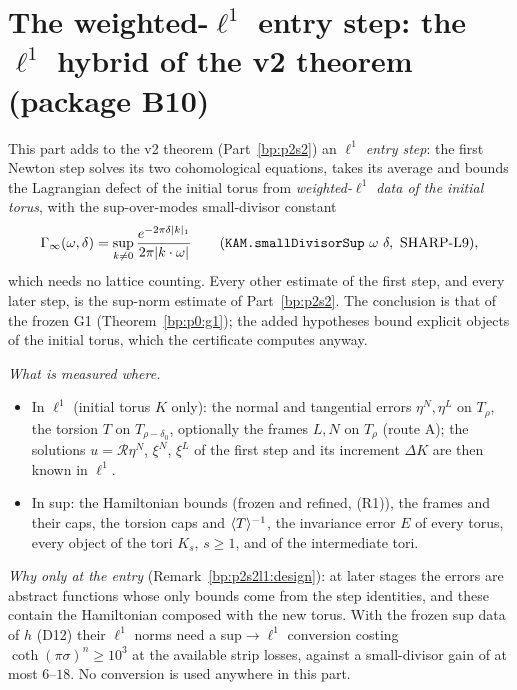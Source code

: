 \section{The weighted-$\ell^1$ entry step: the $\ell^1$ hybrid of the v2 theorem (package B10)}\label{bp:p2s2l1}

This part adds to the v2 theorem (Part~\ref{bp:p2s2}) an \emph{$\ell^1$ entry step}: the first Newton step solves its two
cohomological equations, takes its average and bounds the Lagrangian defect of the initial torus from \emph{weighted-$\ell^1$ data of the
initial torus}, with the sup-over-modes small-divisor constant
\[
\Gamma_\infty(\omega,\delta)=\sup_{k\ne0}\frac{e^{-2\pi\delta\abs k_1}}{2\pi\abs{k\cdot\omega}}\qquad(\Lean{KAM.smallDivisorSup}\ \omega\ \delta,\ \text{SHARP-L9}),
\]
which needs no lattice counting. Every other estimate of the first step, and every later step, is the sup-norm estimate of
Part~\ref{bp:p2s2}. The conclusion is that of the frozen G1 (Theorem~\ref{bp:p0:g1}); the added hypotheses bound explicit objects of the
initial torus, which the certificate computes anyway.

\emph{What is measured where.}
\begin{itemize}
\item In $\ell^1$ (initial torus $K$ only): the normal and tangential errors $\eta^N,\eta^L$ on $T_\rho$, the torsion $T$ on $T_{\rho-\delta_0}$,
  optionally the frames $L,N$ on $T_\rho$ (route A); the solutions $u=\mathcal R\eta^N$, $\xi^N$, $\xi^L$ of the first step and its increment
  $\Delta K$ are then known in $\ell^1$.
\item In sup: the Hamiltonian bounds (frozen and refined, (R1)), the frames and their caps, the torsion caps and $\langle T\rangle^{-1}$, the invariance
  error $E$ of every torus, every object of the tori $K_s$, $s\ge1$, and of the intermediate tori.
\end{itemize}
\emph{Why only at the entry} (Remark~\ref{bp:p2s2l1:design}): at later stages the errors are abstract functions whose only bounds come from
the step identities, and these contain the Hamiltonian composed with the new torus. With the frozen sup data of $h$ (D12) their $\ell^1$
norms need a sup$\to\ell^1$ conversion costing $\coth(\pi\sigma)^n\ge10^{3}$ at the available strip losses, against a small-divisor gain
of at most $6$--$18$. No conversion is used anywhere in this part.

